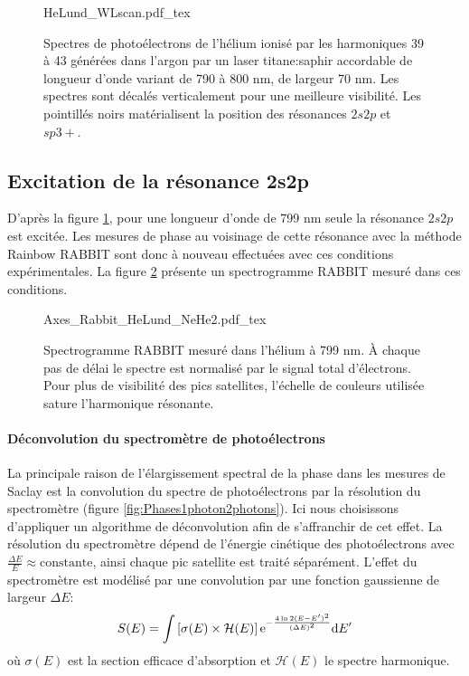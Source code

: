 \begin{figure}
\centering
\def\svgwidth{\textwidth}
{HeLund_WLscan.pdf_tex}
\caption{Spectres de photoélectrons de l'hélium ionisé par les harmoniques 39 à 43 générées dans l'argon par un laser titane:saphir accordable de longueur d'onde variant de 790 à 800 nm, de largeur 70 nm. Les spectres sont décalés verticalement pour une meilleure visibilité. Les pointillés noirs matérialisent la position des résonances $2s2p$ et $sp3+$.}
\label{fig:HeLund_WLscan}
\end{figure}

\subsection{Excitation de la résonance 2s2p}
D'après la figure \ref{fig:HeLund_WLscan}, pour une longueur d'onde de 799 nm seule la résonance $2s2p$ est excitée. Les mesures de phase au voisinage de cette résonance avec la méthode Rainbow RABBIT sont donc à nouveau effectuées avec ces conditions expérimentales. La figure \ref{fig:Rabbit_HeLund_2s2p} présente un spectrogramme RABBIT mesuré dans ces conditions.

\begin{figure}
\centering
\def\svgwidth{0.7\textwidth}
{Axes_Rabbit_HeLund_NeHe2.pdf_tex}
\caption{Spectrogramme RABBIT mesuré dans l'hélium à 799 nm. \`{A} chaque pas de délai le spectre est normalisé par le signal total d'électrons. Pour plus de visibilité des pics satellites, l'échelle de couleurs utilisée sature l'harmonique résonante.}
\label{fig:Rabbit_HeLund_2s2p}
\end{figure}

\paragraph*{Déconvolution du spectromètre de photoélectrons} La principale raison de l'élargissement spectral de la phase dans les mesures de Saclay est la convolution du spectre de photoélectrons par la résolution du spectromètre (figure \ref{fig:Phases1photon2photons}). Ici nous choisissons d'appliquer un algorithme de déconvolution afin de s'affranchir de cet effet. La résolution du spectromètre dépend de l'énergie cinétique des photoélectrons avec $\frac{\Delta E}{E} \approx \text{constante}$, ainsi chaque pic satellite est traité séparément. L'effet du spectromètre est modélisé par une convolution par une fonction gaussienne de largeur $\Delta E$:
\begin{equation}
S(E) = \int \left[ \sigma(E) \times \mathcal{H} (E) \right] \mathrm{e}^{-\frac{4 \ln 2 (E-E')^2}{(\Delta E)^2}} \mathrm{d} E'
\end{equation}
où $\sigma(E)$ est la section efficace d'absorption et $\mathcal{H}(E)$ le spectre harmonique.

